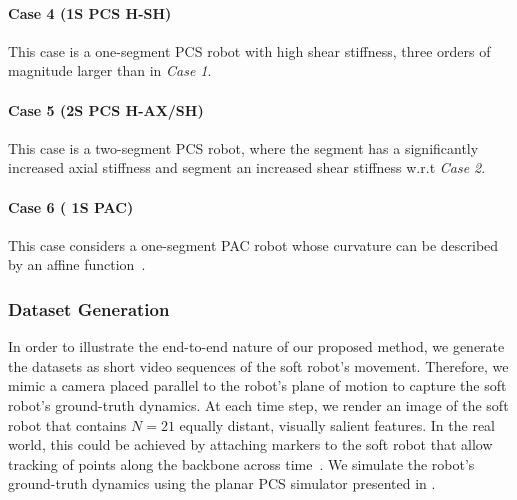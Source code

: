 \paragraph{Case 4 (1S PCS H-SH)}
This case is a one-segment \gls{PCS} robot with high shear stiffness, three orders of magnitude larger than in \emph{Case 1}.

\paragraph{Case 5 (2S PCS H-AX/SH)}
This case is a two-segment \gls{PCS} robot, where the  segment has a significantly increased axial stiffness and  segment an increased shear stiffness w.r.t \emph{Case 2}.

\paragraph{Case 6 ( 1S PAC)} This case considers a one-segment \gls{PAC} robot whose curvature can be described by an affine function~\citep{stella2023piecewise}.



\subsubsection{Dataset Generation}
In order to illustrate the end-to-end nature of our proposed method, we generate the datasets as short video sequences of the soft robot's movement. 
Therefore, we mimic a camera placed parallel to the robot's plane of motion to capture the soft robot's ground-truth dynamics.
At each time step, we render an image of the soft robot that contains $N=21$ equally distant, visually salient features. In the real world, this could be achieved by attaching markers to the soft robot that allow tracking of points along the backbone across time~\citep{stella2022experimental}.
We simulate the robot's ground-truth dynamics using the planar \gls{PCS} simulator presented in \citep{stolzle2024experimental}.

